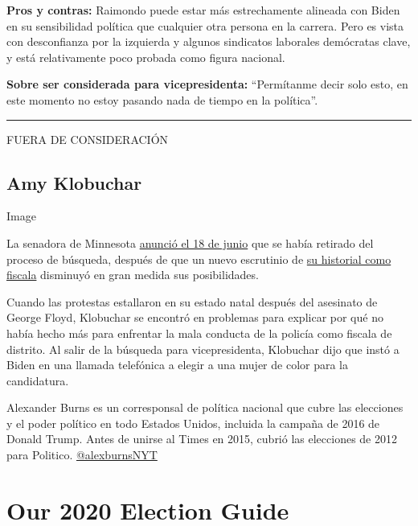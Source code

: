 \textbf{Pros y contras:} Raimondo puede estar más estrechamente alineada
con Biden en su sensibilidad política que cualquier otra persona en la
carrera. Pero es vista con desconfianza por la izquierda y algunos
sindicatos laborales demócratas clave, y está relativamente poco probada
como figura nacional.

\textbf{Sobre ser considerada para vicepresidenta:} ``Permítanme decir
solo esto, en este momento no estoy pasando nada de tiempo en la
política''.

\begin{center}\rule{0.5\linewidth}{\linethickness}\end{center}

FUERA DE CONSIDERACIÓN

\hypertarget{amy-klobuchar}{%
\subsection{Amy Klobuchar}\label{amy-klobuchar}}

Image

La senadora de Minnesota
\href{https://www.nytimes3xbfgragh.onion/2020/06/18/us/politics/amy-klobuchar-biden-vice-president.html}{anunció
el 18 de junio} que se había retirado del proceso de búsqueda, después
de que un nuevo escrutinio de
\href{https://www.nytimes3xbfgragh.onion/2020/05/29/us/politics/klobuchar-minneapolis-george-floyd.html}{su
historial como fiscala} disminuyó en gran medida sus posibilidades.

Cuando las protestas estallaron en su estado natal después del asesinato
de George Floyd, Klobuchar se encontró en problemas para explicar por
qué no había hecho más para enfrentar la mala conducta de la policía
como fiscala de distrito. Al salir de la búsqueda para vicepresidenta,
Klobuchar dijo que instó a Biden en una llamada telefónica a elegir a
una mujer de color para la candidatura.

Alexander Burns es un corresponsal de política nacional que cubre las
elecciones y el poder político en todo Estados Unidos, incluida la
campaña de 2016 de Donald Trump. Antes de unirse al Times en 2015,
cubrió las elecciones de 2012 para Politico.
\href{https://twitter.com/alexburnsNYT}{@alexburnsNYT}

\hypertarget{our-2020-election-guide}{%
\section{Our 2020 Election Guide}\label{our-2020-election-guide}}

